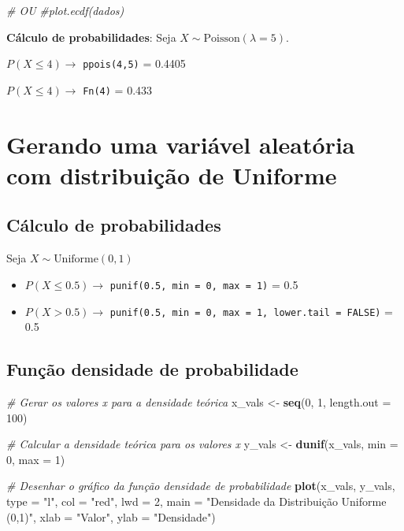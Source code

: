 \documentclass[
]{book}
\newenvironment{Shaded}{\begin{snugshade}}{\end{snugshade}}
\newcommand{\AttributeTok}[1]{\textcolor[rgb]{0.13,0.29,0.53}{#1}}
\newcommand{\CommentTok}[1]{\textcolor[rgb]{0.56,0.35,0.01}{\textit{#1}}}
\newcommand{\DecValTok}[1]{\textcolor[rgb]{0.00,0.00,0.81}{#1}}
\newcommand{\FunctionTok}[1]{\textcolor[rgb]{0.13,0.29,0.53}{\textbf{#1}}}
\newcommand{\NormalTok}[1]{#1}
\newcommand{\OtherTok}[1]{\textcolor[rgb]{0.56,0.35,0.01}{#1}}
\newcommand{\StringTok}[1]{\textcolor[rgb]{0.31,0.60,0.02}{#1}}
\theoremstyle{definition}
\theoremstyle{definition}
\theoremstyle{definition}
\theoremstyle{definition}
\theoremstyle{remark}
\begin{document}
\begin{Shaded}
\begin{Highlighting}[]
\CommentTok{\# OU}
\CommentTok{\#plot.ecdf(dados)}
\end{Highlighting}
\end{Shaded}

\textbf{Cálculo de probabilidades}: Seja \(X\sim\text{Poisson}(\lambda=5)\).

\(P(X\leq 4) \to\) \texttt{ppois(4,5)} = 0.4405

\(P(X \leq 4) \to\) \texttt{Fn(4)} = 0.433

\section{Gerando uma variável aleatória com distribuição de Uniforme}\label{gerando-uma-variuxe1vel-aleatuxf3ria-com-distribuiuxe7uxe3o-de-uniforme}

\subsection{Cálculo de probabilidades}\label{cuxe1lculo-de-probabilidades-2}

Seja \(X\sim \text{Uniforme}(0,1)\)

\begin{itemize}
\item
  \(P(X\leq 0.5) \to\) \texttt{punif(0.5,\ min\ =\ 0,\ max\ =\ 1)} = 0.5
\item
  \(P(X > 0.5) \to\) \texttt{punif(0.5,\ min\ =\ 0,\ max\ =\ 1,\ lower.tail\ =\ FALSE)} = 0.5
\end{itemize}

\subsection{Função densidade de probabilidade}\label{funuxe7uxe3o-densidade-de-probabilidade}

\begin{Shaded}
\begin{Highlighting}[]
\CommentTok{\# Gerar os valores x para a densidade teórica}
\NormalTok{x\_vals }\OtherTok{\textless{}{-}} \FunctionTok{seq}\NormalTok{(}\DecValTok{0}\NormalTok{, }\DecValTok{1}\NormalTok{, }\AttributeTok{length.out =} \DecValTok{100}\NormalTok{)}

\CommentTok{\# Calcular a densidade teórica para os valores x}
\NormalTok{y\_vals }\OtherTok{\textless{}{-}} \FunctionTok{dunif}\NormalTok{(x\_vals, }\AttributeTok{min =} \DecValTok{0}\NormalTok{, }\AttributeTok{max =} \DecValTok{1}\NormalTok{)}

\CommentTok{\# Desenhar o gráfico da função densidade de probabilidade}
\FunctionTok{plot}\NormalTok{(x\_vals, y\_vals, }\AttributeTok{type =} \StringTok{"l"}\NormalTok{, }
     \AttributeTok{col =} \StringTok{"red"}\NormalTok{, }\AttributeTok{lwd =} \DecValTok{2}\NormalTok{, }
     \AttributeTok{main =} \StringTok{"Densidade da Distribuição Uniforme (0,1)"}\NormalTok{,}
     \AttributeTok{xlab =} \StringTok{"Valor"}\NormalTok{, }\AttributeTok{ylab =} \StringTok{"Densidade"}\NormalTok{)}
\end{Highlighting}
\end{Shaded}
\end{document}
